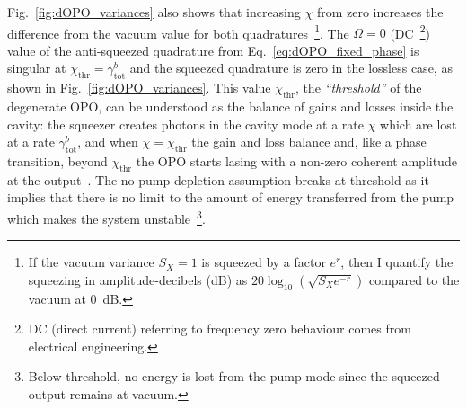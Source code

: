 Fig.~\ref{fig:dOPO_variances} also shows that increasing $\chi$ from zero increases the difference from the vacuum value for both quadratures~\footnote{If the vacuum variance $S_X=1$ is squeezed by a factor $e^r$, then I quantify the squeezing in amplitude-decibels (dB) as $20 \log_{10}(\sqrt{S_X e^{-r}})$ compared to the vacuum at 0~dB.}. %
The $\Omega=0$ (DC~\footnote{DC (direct current) referring to frequency zero behaviour comes from electrical engineering.}) value of the anti-squeezed quadrature from Eq.~\ref{eq:dOPO_fixed_phase} is singular at $\chi_\text{thr}=\gamma^b_\text{tot}$ and the squeezed quadrature is zero in the lossless case, as shown in Fig.~\ref{fig:dOPO_variances}. %
This value $\chi_\text{thr}$, the \emph{``threshold''} of the degenerate OPO, %
can be understood as the balance of gains and losses inside the cavity: the squeezer creates photons in the cavity mode at a rate $\chi$ which are lost at a rate $\gamma^b_\text{tot}$, and when $\chi=\chi_\text{thr}$ the gain and loss balance and, like a phase transition, beyond $\chi_\text{thr}$ the OPO starts lasing with a non-zero coherent amplitude at the output~\cite{walls_1995}. %
The no-pump-depletion assumption breaks at threshold as it implies that there is no limit to the amount of energy transferred from the pump which makes the system unstable~\footnote{Below threshold, no energy is lost from the pump mode since the squeezed output remains at vacuum.}. 
